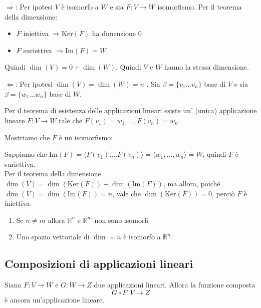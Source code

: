 \documentclass[
  a4paper,
]{article}
\providecommand{\tightlist}{%
  \setlength{\itemsep}{0pt}\setlength{\parskip}{0pt}}
\providecommand{\tightlist}{}
\begin{document}
\begin{proofbox}
\(\Rightarrow\): Per ipotesi \(V\) è isomorfo a \(W\) e sia
\(F: V \to W\) isomorfismo. Per il teorema della dimensione:

\begin{itemize}
\tightlist
\item
  \(F\) iniettiva \(\Rightarrow \text{Ker}(F)\) ha dimensione 0
\item
  \(F\) suriettiva \(\Rightarrow \text{Im}(F) = W\)
\end{itemize}

Quindi \(\dim(V) = 0 + \dim(W)\). Quindi \(V\) e \(W\) hanno la stessa
dimensione.

\(\Leftarrow\): Per ipotesi \(\dim(V) = \dim(W) = n\) . Sia
\(\beta = \{v_1 ... v_n\}\) base di \(V\) e sia
\(\tilde{\beta} = \{w_1 ... w_n\}\) base di \(W\).

Per il teorema di esistenza delle applicazioni lineari esiste un'
(unica) applicazione lineare \(F: V \to W\) tale che
\(F(v_1) = w_1, ..., F(v_n) = w_n\).

Mostriamo che \(F\) è un isomorfismo:

Sappiamo che
\(\text{Im}(F) = \langle F(v_1) .... F(v_n) \rangle = \langle w_1, ..., w_n \rangle = W\),
quindi \(F\) è suriettiva.\\
Per il teorema della dimensione
\(\dim(V) = \dim(\text{Ker}(F)) + \dim(\text{Im}(F))\), ma allora,
poiché \(\dim(V) = \dim(\text{Im}(F)) = n\), vale che
\(\dim(\text{Ker}(F)) = 0\), perciò \(F\) è iniettiva.
\end{proofbox}

\begin{observationbox}[Conseguenze]
\begin{enumerate}
\def\labelenumi{\arabic{enumi}.}
\tightlist
\item
  Se \(n \not = m\) allora \(\mathbb{R}^n\) e \(\mathbb{R}^m\) non sono
  isomorfi
\item
  Uno spazio vettoriale di \(\dim = n\) è isomorfo a \(\mathbb{R}^n\)
\end{enumerate}
\end{observationbox}

\hypertarget{composizioni-di-applicazioni-lineari}{%
\subsection{Composizioni di applicazioni
lineari}\label{composizioni-di-applicazioni-lineari}}

Siano \(F: V \to W\) e \(G: W \to Z\) due applicazioni lineari. Allora
la funzione composta \[
G \circ F : V \to Z
\] è ancora un'applicazione lineare.
\end{document}
